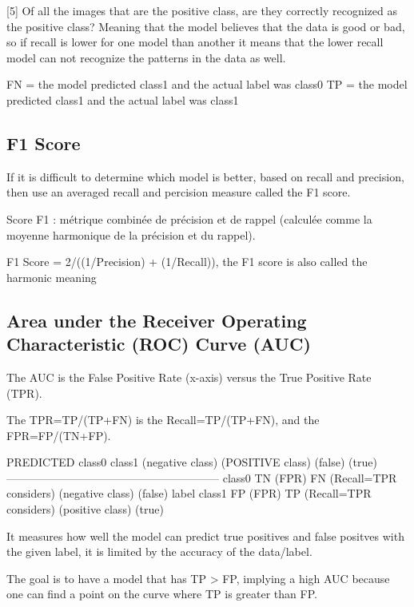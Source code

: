 \documentclass[11pt, onecolumn]{article}
\begin{document}
[5] Of all the images that are the positive class, are they correctly recognized as the positive class? Meaning that the model believes that the data is good or bad, so if recall is lower for one model than another it means that the lower recall model can not recognize the patterns in the data as well. 

FN = the model predicted class1 and the actual label was class0
TP = the model predicted class1 and the actual label was class1





\subsection{F1 Score}

If it is difficult to determine which model is better, based on recall and precision, then use an averaged recall and percision measure called the F1 score. 
 
Score F1 : métrique combinée de précision et de rappel (calculée comme la moyenne harmonique de la précision et du rappel).

F1 Score = 2/((1/Precision) + (1/Recall)), the F1 score is also called the harmonic meaning





\subsection{Area under the Receiver Operating Characteristic (ROC) Curve (AUC)}

The AUC is the False Positive Rate (x-axis) versus the True Positive Rate (TPR).

The TPR=TP/(TP+FN) is the Recall=TP/(TP+FN), and the FPR=FP/(TN+FP).

				PREDICTED
			class0		class1 
        	    (negative class)   (POSITIVE class)
        	       (false)            (true)
	---------------------------------------------------------
	class0		TN (FPR)	FN (Recall=TPR considers)
   (negative class)
        (false)
label
	class1		FP (FPR)	TP (Recall=TPR considers)
   (positive class)
        (true)


It measures how well the model can predict true positives and false positves with the given label, it is limited by the accuracy of the data/label.

The goal is to have a model that has TP > FP, implying a high AUC because one can find a point on the curve where TP is greater than FP.
\end{document}
